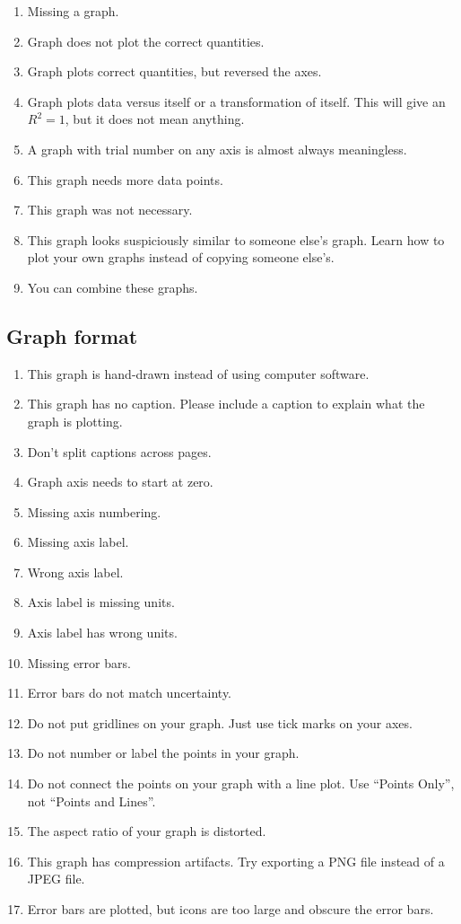 \documentclass[10pt,letterpaper]{article}
\begin{document}
\begin{multicols}{2}
\begin{enumerate}[start=80]
  \item Missing a graph.
  \item Graph does not plot the correct quantities.
  \item Graph plots correct quantities, but reversed the axes.
  \item Graph plots data versus itself or a transformation of itself.
    This will give an $R^2 = 1$, but it does not mean anything.
  \item A graph with trial number on any axis
    is almost always meaningless.
  \item This graph needs more data points.
  \item This graph was not necessary.
  \item This graph looks suspiciously similar to someone else's graph.
    Learn how to plot your own graphs instead of copying someone else's.
  \item You can combine these graphs.
\end{enumerate}

\subsection*{Graph format}

\begin{enumerate}[start=90]
  \item This graph is hand-drawn instead of using computer software.
  \item This graph has no caption.
    Please include a caption to explain what the graph is plotting.
  \item Don't split captions across pages.
  \item Graph axis needs to start at zero.
  \item Missing axis numbering.
  \item Missing axis label.
  \item Wrong axis label.
  \item Axis label is missing units.
  \item Axis label has wrong units.
  \item Missing error bars.
  \item Error bars do not match uncertainty.
  \item Do not put gridlines on your graph. Just use tick marks on your axes.
  \item Do not number or label the points in your graph.
  \item Do not connect the points on your graph with a line plot.
    Use ``Points Only'', not ``Points and Lines''.
  \item The aspect ratio of your graph is distorted.
  \item This graph has compression artifacts.
    Try exporting a PNG file instead of a JPEG file.
  \item Error bars are plotted,
    but icons are too large and obscure the error bars.
\end{enumerate}


\end{multicols}
\end{document}
